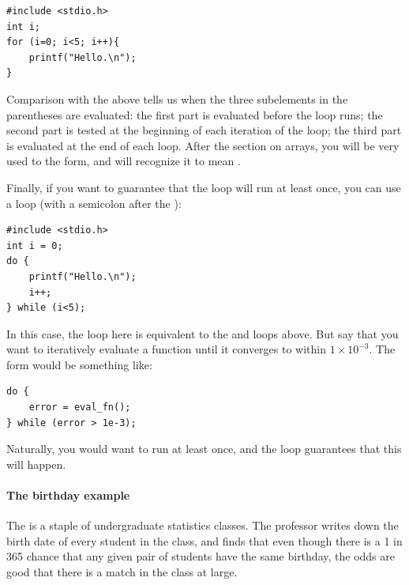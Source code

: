 \begin{lstlisting}
#include <stdio.h>
int i;
for (i=0; i<5; i++){
    printf("Hello.\n");
}
\end{lstlisting}

Comparison with the above tells us when the three subelements in the
parentheses are evaluated: the first part is evaluated before the
loop runs; the second part is tested at the beginning of each
iteration of the loop; the third part is evaluated at the end of each
loop. After the section on arrays, you will be very used to the 
 form, and will recognize it to mean .

Finally, if you want to guarantee that the loop will run at least once, you can use a  loop (with a semicolon after the ):

\begin{lstlisting}
#include <stdio.h>
int i = 0;
do {
    printf("Hello.\n");
    i++;
} while (i<5);
\end{lstlisting}
In this case, the  loop here is equivalent to the
 and  loops above. But say that you want to
iteratively evaluate a function until it converges to within $1\times
10^{-3}$.  The form would be something like:
\begin{lstlisting}
do {
    error = eval_fn();
} while (error > 1e-3);
\end{lstlisting}
Naturally, you would want to run  at least once, and the
 loop guarantees that this will happen.



\paragraph{The birthday example} The  is a staple
of undergraduate statistics classes. The professor writes down the birth
date of every student in the class, and finds that even though there is
a 1 in 365 chance that any given pair of students have the same birthday, 
the odds are good that there is a match in the class at large.

\lstset{numbers=left, numberstyle=\scshape}
\lstset{numbers=none}

